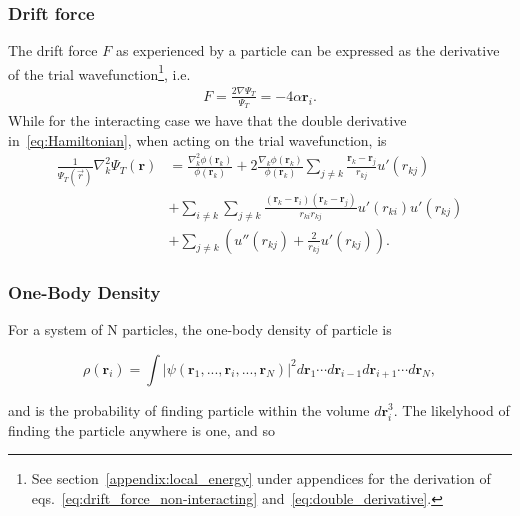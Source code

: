 \documentclass[
    a4paper, aps, twocolumn, floatfix, superscriptaddress,
    nofootinbib]{revtex4-1}
\begin{document}
\subsubsection{Drift force}\label{subsubsec:drift_force}
The drift force $F$ as experienced by a particle can be expressed as the derivative of the trial wavefunction\footnote{See section~\ref{appendix:local_energy} under appendices for the derivation of eqs.~\eqref{eq:drift_force_non-interacting} and~\eqref{eq:double_derivative}.}, i.e.
\begin{align}
    F = \frac{2\nabla \Psi_T}{\Psi_T} = -4\alpha \boldsymbol{r}_i. \label{eq:drift_force_non-interacting}
\end{align}
While for the interacting case we have that the double derivative in~\eqref{eq:Hamiltonian}, when acting on the trial wavefunction, is
\begin{align}
    \frac{1}{\Psi_T(\vec r)} \nabla^{2}_{k} \Psi_{T}(\boldsymbol{r})  &=\frac{\nabla_k^2 \phi(\boldsymbol{r}_k)}{\phi(\boldsymbol{r}_k)} + 2\frac{\nabla_k \phi(\boldsymbol{r}_k)}{\phi(\boldsymbol{r}_k)} \sum_{j\neq k} \frac{\boldsymbol{r}_k-\boldsymbol{r}_j}{r_{kj}} u'(r_{kj})\label{eq:double_derivative} \\
    &+\sum_{i\neq k} \sum_{j \neq k} \frac{\left(\boldsymbol{r}_k - \boldsymbol{r}_i\right)\left(\boldsymbol{r}_k - \boldsymbol{r}_j\right)}{r_{ki} r_{kj}} u'(r_{ki}) u'(r_{kj})\nonumber\\
    &+\sum_{j\neq k}\left( u''(r_{kj}) + \frac{2}{r_{kj}}u'(r_{kj}) \right)\nonumber.
\end{align}

\subsubsection{One-Body Density}\label{subsubsec:one_body}
For a system of N particles, the one-body density of particle  is 

\begin{equation}
    \rho(\boldsymbol{r}_i) = \int |\psi(\boldsymbol{r}_1,...,\boldsymbol{r}_{i},...,\boldsymbol{r}_{N})|^2 d\boldsymbol{r}_1 \cdots d\boldsymbol{r}_{i-1} d\boldsymbol{r}_{i+1} \cdots d\boldsymbol{r}_{N},
\end{equation}

and is the probability of finding particle  within the volume $d\boldsymbol{r}_i^3$. The likelyhood of finding the particle anywhere is one, and so 
\end{document}
